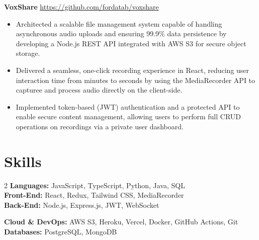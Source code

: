 \documentclass[11pt]{article}       %
\begin{document}
\textbf{VoxShare} \hfill \href{https://github.com/fordatab/voxshare}{https://github.com/fordatab/voxshare} \
\vspace{-10pt}
\begin{itemize}
\item Architected a scalable file management system capable of handling asynchronous audio uploads and ensuring 99.9\% data persistence by developing a Node.js REST API integrated with AWS S3 for secure object storage.
\item Delivered a seamless, one-click recording experience in React, reducing user interaction time from minutes to seconds by using the MediaRecorder API to capturee and process audio directly on the client-side.
\item Implemented token-based (JWT) authentication and a protected API to enable secure content management, allowing users to perform full CRUD operations on recordings via a private user dashboard.
\end{itemize}


\vspace{-18.5pt}

\section*{Skills}
\noindent\begin{minipage}{\textwidth}


\begin{multicols}{2}
    \noindent\textbf{Languages:} JavaScript, TypeScript, Python, Java, SQL \\
    \textbf{Front-End:} React, Redux, Tailwind CSS, MediaRecorder  \\
    \textbf{Back-End:} Node.js, Express.js, JWT, WebSocket
    
    \columnbreak %
    
    \noindent\textbf{Cloud \& DevOps:} AWS S3, Heroku, Vercel, Docker, GitHub Actions, Git \\
    \textbf{Databases:} PostgreSQL, MongoDB
\end{multicols}
\end{minipage}
\end{document}
